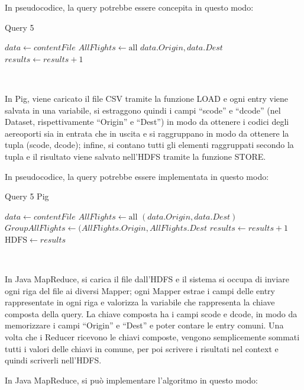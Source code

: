 \documentclass[11pt]{article} %
\begin{document}
In pseudocodice, la query potrebbe essere concepita in questo modo:

\begin{algorithm}
\caption{Query 5}\label{euclid}
\begin{algorithmic}[0]
\State $data \gets contentFile$
\State $AllFlights \gets \text{all } data.Origin, data.Dest$
\State $results \gets results + 1$
\EndFor
\end{algorithmic}
\end{algorithm}

~

In Pig, viene caricato il file CSV tramite la funzione LOAD e ogni entry viene salvata in una variabile, si estraggono quindi i campi ``scode'' e ``dcode'' (nel Dataset, rispettivamente ``Origin'' e ``Dest'') in modo da ottenere i codici degli aereoporti sia in entrata che in uscita e si raggruppano in modo da ottenere la tupla (scode, dcode); infine, si contano tutti gli elementi raggruppati secondo la tupla e il risultato viene salvato nell'HDFS tramite la funzione STORE.

In pseudocodice, la query potrebbe essere implementata in questo modo:

\begin{algorithm}
\caption{Query 5 Pig}\label{euclid}
\begin{algorithmic}[0]
\State $data \gets contentFile$
\State $AllFlights \gets \text{all } (data.Origin, data.Dest)$
\State $GroupAllFlights \gets (AllFlights.Origin, AllFlights.Dest$
	\State $results \gets results + 1$
\EndFor
\State $\text{HDFS}\gets results$
\end{algorithmic}
\end{algorithm}

~

In Java MapReduce, si carica il file dall'HDFS e il sistema si occupa di inviare ogni riga del file ai diversi Mapper; ogni Mapper estrae i campi delle entry rappresentate in ogni riga e valorizza la variabile che rappresenta la chiave composta della query. La chiave composta ha i campi scode e dcode, in modo da memorizzare i campi ``Origin'' e ``Dest'' e poter contare le entry comuni. Una volta che i Reducer ricevono le chiavi composte, vengono semplicemente sommati tutti i valori delle chiavi in comune, per poi scrivere i risultati nel context e quindi scriverli nell'HDFS.

In Java MapReduce, si può implementare l'algoritmo in questo modo:
\end{document}
